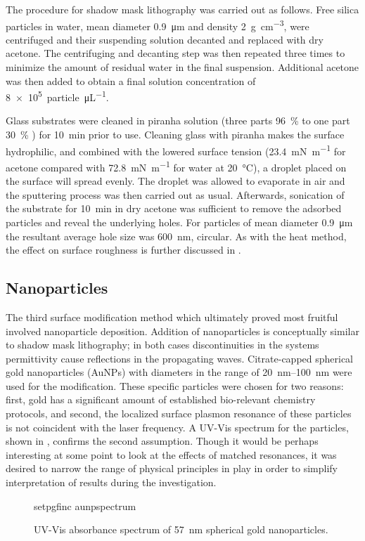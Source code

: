 The procedure for shadow mask lithography was carried out as follows.  Free
silica particles in water, mean diameter \SI{0.9}{\micro\meter} and density
\SI{2}{\gram\per\centi\meter\cubed}, were centrifuged and their suspending
solution decanted and replaced with dry acetone.  The centrifuging and
decanting step was then repeated three times to minimize the amount of
residual water in the final suspension.  Additional acetone was then added
to obtain a final solution concentration of
\SI{8e5}{particle\per\micro\liter}.  

Glass substrates were cleaned in piranha solution (three parts
\SI{96}{\percent}  to one part \SI{30}{\percent} ) for
\SI{10}{\minute} prior to use.  Cleaning glass with piranha makes the
surface hydrophilic, and combined with the lowered surface tension
(\SI{23.4}{\milli\newton\per\meter} for acetone compared with
\SI{72.8}{\milli\newton\per\meter} for water at \SI{20}{\celsius}), a
droplet placed on the surface will spread evenly.  The droplet was allowed
to evaporate in air and the sputtering process was then carried out as
usual.  Afterwards, sonication of the substrate for \SI{10}{\minute} in
dry acetone was sufficient to remove the adsorbed particles and reveal the
underlying holes.  For particles of mean diameter \SI{0.9}{\micro\meter}
the resultant average hole size was \SI{600}{\nano\meter}, circular.  As
with the heat method, the effect on surface roughness is further discussed
in .

\subsection{Nanoparticles}
The third surface modification method which ultimately proved most fruitful
involved nanoparticle deposition.  Addition of nanoparticles is
conceptually similar to shadow mask lithography; in both cases
discontinuities in the systems permittivity cause reflections in the
propagating waves.  Citrate-capped spherical gold nanoparticles (AuNPs)
with diameters in the range of \SIrange{20}{100}{\nano\meter} were used for
the modification.  These specific particles were chosen for two reasons:
first, gold has a significant amount of established bio-relevant chemistry
protocols, and second, the localized surface plasmon resonance of these
particles is not coincident with the laser frequency.  A UV-Vis spectrum
for the particles, shown in , confirms the second
assumption.  Though it would be perhaps interesting at some point to look
at the effects of matched resonances, it was desired to narrow the range of
physical principles in play in order to simplify interpretation of results
during the investigation.

\begin{figure}[ht]
 \centering
 {setpgfinc}
 {aunpspectrum}
 \caption{UV-Vis absorbance spectrum of \SI{57}{\nano\meter} spherical gold
 nanoparticles.}
\label{fig:aunpspectrum}
\end{figure}

